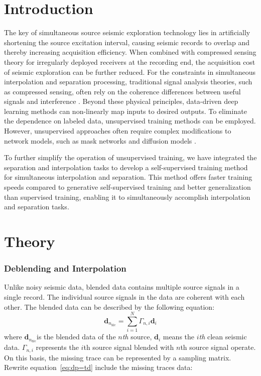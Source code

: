 \documentclass{segabs}
\begin{document}
\section{Introduction}
The key of simultaneous source seismic exploration technology lies in artificially shortening the source excitation interval, causing seismic records to overlap and thereby increasing acquisition efficiency. When combined with compressed sensing theory for irregularly deployed receivers at the recording end, the acquisition cost of seismic exploration can be further reduced. 
For the constraints in simultaneous interpolation and separation processing, traditional signal analysis theories, such as compressed sensing, often rely on the coherence differences between useful signals and interference \cite[]{zhouSimultaneousDeblendingInterpolation2018}. Beyond these physical principles, data-driven deep learning methods can non-linearly map inputs to desired outputs. To eliminate the dependence on labeled data, unsupervised training methods can be employed. However, unsupervised approaches often require complex modifications to network models, such as mask networks \cite[]{wangSelfsupervisedSimultaneousDeblending2024} and diffusion models \cite[]{sen2019}. 

To further simplify the operation of unsupervised training, we have integrated the separation and interpolation tasks to develop a self-supervised training method for simultaneous interpolation and separation. This method offers faster training speeds compared to generative self-supervised training and better generalization than supervised training, enabling it to simultaneously accomplish interpolation and separation tasks. 
\section*{Theory}

\subsubsection{Deblending and Interpolation}

Unlike noisy seismic data, blended data contains multiple source signals in a single record. The individual source signals in the data are coherent with each other. The blended data can be described by the following equation:
\begin{equation}\label{eq:dp=td}
\mathbf{d}_{n_{ble}}=\sum_{i=1}^{N}\Gamma_{n,i}\mathbf{d}_i
\end{equation}
where $\mathbf{d}_{n_{ble}}$is the blended data of the $n$\textit{th} source, $\mathbf{d}_i$ means the $i$\textit{th} clean seismic data. $\Gamma_{n,i}$ represents the $i$th source signal blended with $n$th source signal operate. On this basis, the missing trace can be represented by a sampling matrix. Rewrite equation~\ref{eq:dp=td} include the missing traces data:
\end{document}
